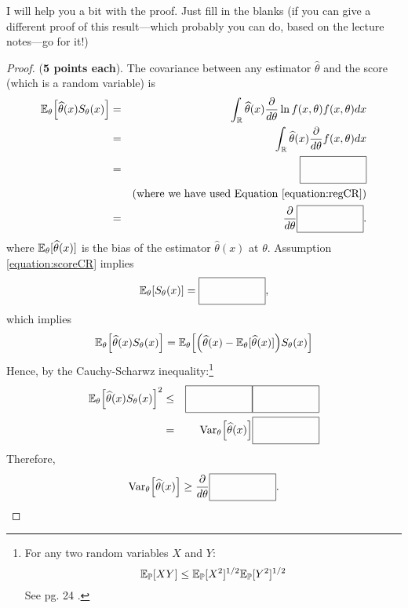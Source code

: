 \documentclass[11pt]{article} %
\begin{document}
\noindent I will help you a bit with the proof. Just fill in the blanks (if you can give a different proof of this result---which probably you can do, based on the lecture notes---go for it!)

\begin{proof}
\noindent  (\textbf{5 points each}). The covariance between any estimator $\widehat{\theta}$ and the score (which is a random variable) is
\begin{eqnarray*}
\mathbb{E}_{\theta} \Big[ \widehat{\theta}(x) S_{\theta}(x) \Big] &=&  \int_{\mathbb{R}} \widehat{\theta}(x) \frac{\partial}{d\theta} \ln f(x,\theta) f(x,\theta) dx \\
&=& \int_{\mathbb{R}} \widehat{\theta}(x) \frac{\partial}{d\theta} f(x,\theta) dx \\
&=& \boxed{\quad \quad \Big. \Big.  \hspace{.5cm} \quad \quad } \\
&& (\text{where we have used Equation \ref{equation:regCR}}) \\
&=& \frac{\partial}{d\theta} \boxed{\quad \quad \Big. \Big.  \hspace{.5cm} \quad \quad }.
\end{eqnarray*}
\noindent where $\mathbb{E}_{\theta}[\widehat{\theta}(x)]$ is the bias of the estimator $\widehat{\theta}(x)$ at $\theta$. Assumption \ref{equation:scoreCR} implies 
$$\mathbb{E}_{\theta}[S_{\theta}(x)]= \boxed{\quad \quad \Big. \Big.  \hspace{.5cm} \quad \quad } \\ ,$$
\noindent which implies
$$\mathbb{E}_{\theta} \Big[ \widehat{\theta}(x) S_{\theta}(x) \Big] = \mathbb{E}_{\theta} \Big[ \Big(\widehat{\theta}(x)-\mathbb{E}_{\theta}[\widehat{\theta}(x)] \Big)S_{\theta}(x) \Big]$$
\noindent Hence, by the Cauchy-Scharwz inequality:\footnote{For any two random variables $X$ and $Y$:
\begin{equation*}
\mathbb{E}_{\mathbb{P}}[XY] \leq \mathbb{E}_{\mathbb{P}}[X^2]^{1/2} \mathbb{E}_{\mathbb{P}}[Y^2]^{1/2}
\end{equation*}
See pg. 24 \cite{durrett2010}. 
}
\begin{eqnarray*}
\mathbb{E}_{\theta} \Big[ \widehat{\theta}(x) S_{\theta}(x) \Big]^2 &\leq&  \boxed{\quad \quad \Big. \Big.  \hspace{.5cm} \quad \quad }  \boxed{\quad \quad \Big. \Big.  \hspace{.5cm} \quad \quad } \\
&=& \text{Var}_{\theta} \Big[ \widehat{\theta}(x) \Big] \boxed{\quad \quad \Big. \Big.  \hspace{.5cm} \quad \quad }
\end{eqnarray*}
\noindent Therefore,
$$\text{Var}_{\theta}\Big[ \widehat{\theta}(x)\Big] \geq  \frac{\partial}{d\theta} \boxed{\quad \quad \Big. \Big.  \hspace{.5cm} \quad \quad }.$$
\end{proof}
\end{document}
